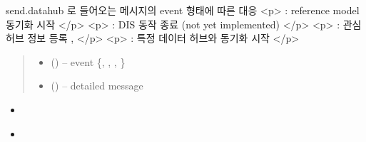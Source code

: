 \documentclass[a4paper,10pt,english]{sphinxmanual}
\begin{document}
\begin{fulllineitems}
\begin{fulllineitems}
\label{\detokenize{_ctrlKafka:ctrlConsumer.eventSwitch}}
\pysigstartsignatures
{}
\pysigstopsignatures
\sphinxAtStartPar
send.datahub 로 들어오는 메시지의 event 형태에 따른 대응
<p>  : reference model 동기화 시작  </p>
<p>  : DIS 동작 종료 (not yet implemented) </p>
<p>  : 관심 허브 정보 등록  ,  </p>
<p>  : 특정 데이터 허브와 동기화 시작  </p>
\begin{quote}\begin{description}
\begin{itemize}
\item {} 
\sphinxAtStartPar
{} () – event \{, , , \}

\item {} 
\sphinxAtStartPar
{} () – detailed message

\end{itemize}

\end{description}\end{quote}


\nopagebreak

\begin{itemize}
\item {} 
\sphinxAtStartPar
{\hyperref[\detokenize{_DHDaemon:DHDaemon._rmSyncInit}]{}}

\item {} 
\sphinxAtStartPar
{\hyperref[\detokenize{_DHDaemon:DHDaemon._dhSearchUpdateInterestTopic}]{}}


\end{itemize}
\end{fulllineitems}
\end{fulllineitems}
\end{document}
